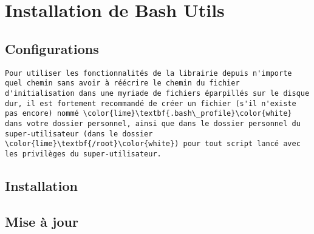 \documentclass[a4paper,10pt]{article}
\begin{document}
\color{red}
\section{Installation de Bash Utils}\color{white}

\color{green}
\subsection{Configurations}\color{white}

\begin{verbatim}
Pour utiliser les fonctionnalités de la librairie depuis n'importe quel chemin sans avoir à réécrire le chemin du fichier d'initialisation dans une myriade de fichiers éparpillés sur le disque dur, il est fortement recommandé de créer un fichier (s'il n'existe pas encore) nommé \color{lime}\textbf{.bash\_profile}\color{white} dans votre dossier personnel, ainsi que dans le dossier personnel du super-utilisateur (dans le dossier \color{lime}\textbf{/root}\color{white}) pour tout script lancé avec les privilèges du super-utilisateur.
\end{verbatim}

\color{green}
\subsection{Installation}\color{white}

\color{green}
\subsection{Mise à jour}\color{white}
\end{document}
